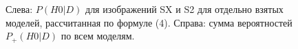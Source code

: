 \begin{figure}[h]
\begin{minipage}[h]{0.49\linewidth}
\end{minipage}
\hfill
\begin{minipage}[h]{0.49\linewidth}
\end{minipage}
\caption{Слева: $P( H0 |D)$ для изображений SX и S2 для отдельно взятых моделей, рассчитанная по формуле (4). Справа: сумма вероятностей $P_{+}( H0 |D)$ по всем моделям.}
\label{fig:probs2}
\end{figure}



